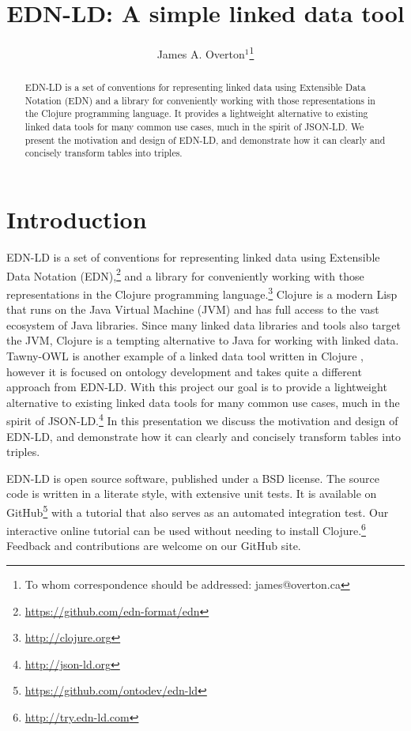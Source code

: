 \documentclass{icbo}
\begin{document}
\title[EDN-LD]{EDN-LD: A simple linked data tool}
\author[Overton]{James A. Overton$^{1}$\footnote{To whom correspondence should be addressed: james@overton.ca}}
\address{$^{1}$Knocean, Toronto, Ontario, Canada}

\maketitle

\begin{abstract}
EDN-LD is a set of conventions for representing linked data using Extensible Data Notation (EDN) and a library for conveniently working with those representations in the Clojure programming language. It provides a lightweight alternative to existing linked data tools for many common use cases, much in the spirit of JSON-LD. We present the motivation and design of EDN-LD, and demonstrate how it can clearly and concisely transform tables into triples.
\end{abstract}


\section{Introduction}

EDN-LD is a set of conventions for representing linked data using Extensible Data Notation (EDN),\footnote{\url{https://github.com/edn-format/edn}} and a library for conveniently working with those representations in the Clojure programming language.\footnote{\url{http://clojure.org}} Clojure is a modern Lisp that runs on the Java Virtual Machine (JVM) and has full access to the vast ecosystem of Java libraries. Since many linked data libraries and tools also target the JVM, Clojure is a tempting alternative to Java for working with linked data. Tawny-OWL is another example of a linked data tool written in Clojure \citep{Lord2013}, however it is focused on ontology development and takes quite a different approach from EDN-LD. With this project our goal is to provide a lightweight alternative to existing linked data tools for many common use cases, much in the spirit of JSON-LD.\footnote{\url{http://json-ld.org}} In this presentation we discuss the motivation and design of EDN-LD, and demonstrate how it can clearly and concisely transform tables into triples.

EDN-LD is open source software, published under a BSD license. The source code is written in a literate style, with extensive unit tests. It is available on GitHub\footnote{\url{https://github.com/ontodev/edn-ld}} with a tutorial that also serves as an automated integration test. Our interactive online tutorial can be used without needing to install Clojure.\footnote{\url{http://try.edn-ld.com}} Feedback and contributions are welcome on our GitHub site.
\end{document}
